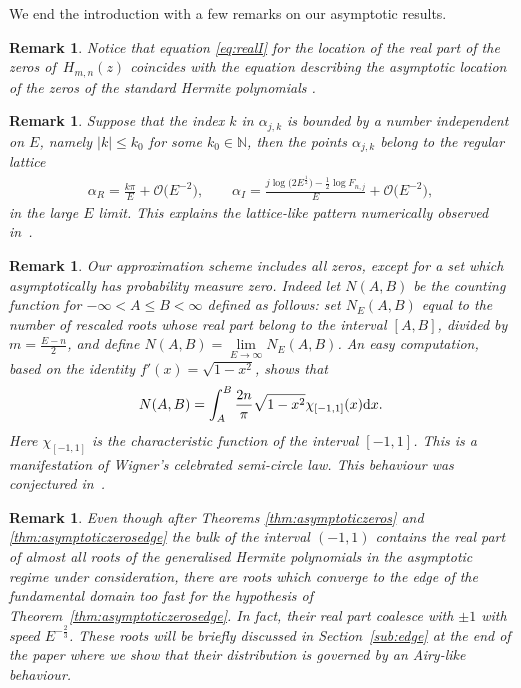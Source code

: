 \documentclass[pdftex]{sigma}
\numberwithin{equation}{section}
\newtheorem{rem*}[thm]{Remark}
\newcommand{\bb}[1]{\mathbb{ #1 }}
\newcommand{\al}{\alpha}
\begin{document}
We end the introduction with a few remarks on our asymptotic results.
\begin{rem*}\sloppy
Notice that equation \eqref{eq:realI} for the location of the real part of the zeros of~$H_{m,n}(z)$ coincides with the equation describing the asymptotic location of the zeros of the standard Hermite polynomials \cite[Section~10.17]{bateman2}.
\end{rem*}

\begin{rem*}
	Suppose that the index $k$ in $\al_{j,k}$ is bounded by a number independent on $E$, namely $|k|\leq k_0$ for some $k_0 \in \bb{N}$,
	then the points $\al_{j,k}$ belong to the regular lattice
	\begin{gather*}
	\al_R=\frac{k \pi}{E}+\mathcal{O}\big(E^{-2}\big), \qquad \al_I=\frac{j \log \big(2 E^{\frac12} \big)
		-\frac{1}{2} \log F_{n,j}}{E}+\mathcal{O}\big(E^{-2}\big) ,
	\end{gather*}
	in the large $E$ limit. This explains the lattice-like pattern numerically observed in~\cite{clarkson2003piv}.
\end{rem*}

\begin{rem*} Our approximation scheme includes all zeros, except for a set which asymptotically has probability measure zero. Indeed let $N(A,B)$ be the counting function for $-\infty< A\leq B <\infty$ def\/ined as follows: set $N_E(A,B)$ equal to the number of rescaled roots whose real part belong to the interval $[A,B]$, divided by $m=\frac{E-n}2$, and def\/ine $N(A,B)=\lim\limits_{E\to \infty}N_E(A,B)$. An easy computation, based on the identity $ f'(x)= \sqrt{1-x^2}$, shows that
\begin{gather*}%
	N(A,B)=\int_A^B \frac{2 n}{\pi} \sqrt{1-x^2} \chi_{[-1,1]}(x) {\rm d}x.
	\end{gather*}
Here $\chi_{[-1,1]}$ is the characteristic function of the interval $[-1,1]$.	This is a manifestation of Wigner's celebrated semi-circle law.
This behaviour was conjectured in~\cite{FEL}.
\end{rem*}

\begin{rem*} Even though after Theorems \ref{thm:asymptoticzeros} and \ref{thm:asymptoticzerosedge} the bulk of the interval $(-1,1)$ contains
the real part of almost all roots of the generalised Hermite polynomials in the asymptotic regime under consideration, there are roots which converge to the edge of the fundamental domain too fast for the hypothesis of Theorem~\ref{thm:asymptoticzerosedge}. In fact, their real part coalesce with $\pm1$ with speed $E^{-\frac23}$. These roots will be brief\/ly discussed in Section~\ref{sub:edge} at the end of the paper where we show that their distribution is
governed by an Airy-like behaviour.
\end{rem*}
\end{document}
